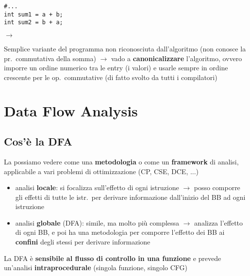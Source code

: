 \noindent\begin{minipage}[c]{.3\textwidth}
  \begin{lstlisting}
#...
int sum1 = a + b;
int sum2 = b + a;\end{lstlisting}
\end{minipage}\hfill $\rightarrow$
\begin{minipage}[c]{.65\textwidth}
  Semplice variante del programma non riconosciuta dall'algoritmo (non conosce la pr.~commutativa della somma) $\rightarrow$ vado a \textbf{canonicalizzare} l'algoritmo, ovvero imporre un ordine numerico tra le entry (i valori) e usarle sempre in ordine crescente per le op.~commutative (di fatto svolto da tutti i compilatori)
\end{minipage}

\section{Data Flow Analysis}

\subsection{Cos'\`e la DFA}

La possiamo vedere come una \textbf{metodologia} o come un \textbf{framework} di analisi, applicabile a vari problemi di ottimizzazione (CP, CSE, DCE, ...)

\begin{itemize}
  \item analisi \textbf{locale}: si focalizza sull'effetto di ogni istruzione $\rightarrow$ posso comporre gli effetti di tutte le istr.~per derivare informazione dall'inizio del BB ad ogni istruzione
  \item analisi \textbf{globale} (DFA): simile, ma molto pi\`u complessa $\rightarrow$ analizza l'effetto di ogni BB, e poi ha una metodologia per comporre l'effetto dei BB ai \textbf{confini} degli stessi per derivare informazione
\end{itemize}

La DFA \`e \textbf{sensibile al flusso di controllo in una funzione} e prevede un'analisi \textbf{intraprocedurale} (singola funzione, singolo CFG)

